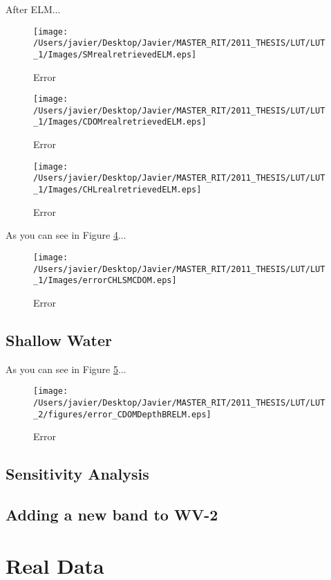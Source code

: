   After ELM...

  \begin{figure}[H]
	\centering
    	\texttt{[image: /Users/javier/Desktop/Javier/MASTER\_RIT/2011\_THESIS/LUT/LUT\_1/Images/SMrealretrievedELM.eps]}
 	\caption{Error  \label{fig:errorLUT1}}
  \end{figure}



  \begin{figure}[H]
	\centering
    	\texttt{[image: /Users/javier/Desktop/Javier/MASTER\_RIT/2011\_THESIS/LUT/LUT\_1/Images/CDOMrealretrievedELM.eps]}
 	\caption{Error  \label{fig:errorLUT1}}
  \end{figure}
  
  
  
  \begin{figure}[H]
	\centering
    	\texttt{[image: /Users/javier/Desktop/Javier/MASTER\_RIT/2011\_THESIS/LUT/LUT\_1/Images/CHLrealretrievedELM.eps]}
 	\caption{Error  \label{fig:errorLUT1}}
  \end{figure}

As you can see in Figure \ref{fig:errorLUT1}...

  \begin{figure}[H]
	\centering
    	\texttt{[image: /Users/javier/Desktop/Javier/MASTER\_RIT/2011\_THESIS/LUT/LUT\_1/Images/errorCHLSMCDOM.eps]}
 	\caption{Error  \label{fig:errorLUT1}}
  \end{figure}

\subsection{Shallow Water}

As you can see in Figure \ref{fig:errorLUT2}...

  \begin{figure}[H]
	\centering
    	\texttt{[image: /Users/javier/Desktop/Javier/MASTER\_RIT/2011\_THESIS/LUT/LUT\_2/figures/error\_CDOMDepthBRELM.eps]}
 	\caption{Error  \label{fig:errorLUT2}}
  \end{figure}

\subsection{Sensitivity Analysis}
\subsection{Adding a new band to WV-2}

\section{Real Data}